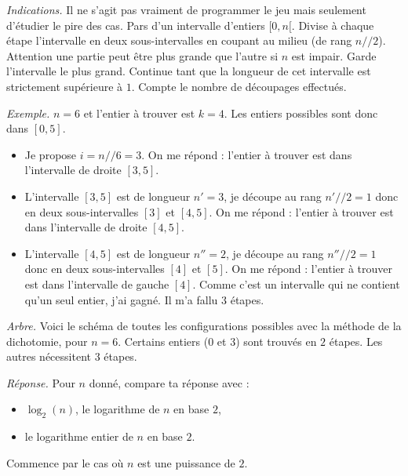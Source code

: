 \documentclass[11pt,class=report,crop=false]{standalone}
\begin{document}
\begin{activite}
\begin{enumerate}
   \bigskip 
    
  \emph{Indications.} Il ne s'agit pas vraiment de programmer le jeu mais seulement d'étudier le pire des cas. Pars d'un intervalle d'entiers $[0,n[$. Divise à chaque étape l'intervalle en deux sous-intervalles en coupant au milieu (de rang $n//2$). 
  Attention une partie peut être plus grande que l'autre si $n$ est impair. Garde l'intervalle le plus grand. Continue tant que la longueur de cet intervalle est strictement supérieure à $1$.
  Compte le nombre de découpages effectués.
    
   \bigskip 
    
  \emph{Exemple.} $n=6$ et l'entier à trouver est $k=4$. Les entiers possibles sont donc dans $[0,5]$.
  \begin{itemize}
    \item Je propose $i = n//6 = 3$. On me répond : \og{}l'entier à trouver est dans l'intervalle de droite $[3,5]$\fg{}.
    
    \item L'intervalle $[3,5]$ est de longueur $n'=3$, je découpe au rang $n'//2=1$ donc en deux sous-intervalles $[3]$ et $[4,5]$.  On me répond : \og{}l'entier à trouver est dans l'intervalle de droite $[4,5]$\fg{}.
    
    \item L'intervalle $[4,5]$ est de longueur $n''=2$, je découpe au rang $n''//2=1$ donc en deux sous-intervalles $[4]$ et $[5]$.  On me répond : \og{}l'entier à trouver est dans l'intervalle de gauche $[4]$\fg{}. Comme c'est un intervalle qui ne contient qu'un seul entier, j'ai gagné. Il m'a fallu $3$ étapes.
  \end{itemize}
  
  \bigskip
  
  \emph{Arbre.}
  Voici le schéma de toutes les configurations possibles avec la méthode de la dichotomie, pour $n=6$. Certains entiers ($0$ et $3$) sont trouvés en $2$ étapes. Les autres nécessitent $3$ étapes.
   
 
  
    \bigskip
  
  \emph{Réponse.} Pour $n$ donné, compare ta réponse avec :
  \begin{itemize}
    \item $\log_2(n)$, le logarithme de $n$ en base $2$,
    \item le logarithme entier de $n$ en base $2$.
  \end{itemize}
  Commence par le cas où $n$ est une puissance de $2$.
  

\end{enumerate}
\end{activite}
\end{document}
